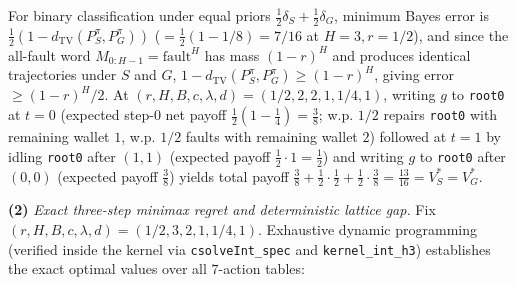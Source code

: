 \documentclass[11pt,a4paper]{article}
\begin{document}
For binary classification under equal priors
\(\frac{1}{2}\delta_S + \frac{1}{2}\delta_G\), minimum Bayes error is
\(\frac{1}{2}(1 - d_{\mathrm{TV}}(P_S^\pi, P_G^\pi))\)
(\(= \frac{1}{2}(1 - 1/8) = 7/16\) at \(H=3, r=1/2\)), and since the
all-fault word \(M_{0:H-1} = \mathrm{fault}^H\) has mass \((1-r)^H\) and
produces identical trajectories under \(S\) and \(G\),
\(1 - d_{\mathrm{TV}}(P_S^\pi, P_G^\pi) \ge (1-r)^H\), giving error
\(\ge (1-r)^H/2\). At \((r,H,B,c,\lambda,d) = (1/2, 2, 2, 1, 1/4, 1)\),
writing \(g\) to \texttt{root0} at \(t=0\) (expected step-0 net payoff
\(\frac{1}{2}(1 - \frac{1}{4}) = \frac{3}{8}\); w.p. \(1/2\) repairs
\texttt{root0} with remaining wallet \(1\), w.p. \(1/2\) faults with
remaining wallet \(2\)) followed at \(t=1\) by idling \texttt{root0}
after \((1,1)\) (expected payoff \(\frac{1}{2}\cdot 1 = \frac{1}{2}\))
and writing \(g\) to \texttt{root0} after \((0,0)\) (expected payoff
\(\frac{3}{8}\)) yields total payoff
\(\frac{3}{8} + \frac{1}{2}\cdot\frac{1}{2} + \frac{1}{2}\cdot\frac{3}{8} = \frac{13}{16} = V_S^* = V_G^*\).

\textbf{(2)} \emph{Exact three-step minimax regret and deterministic
lattice gap.} Fix \((r, H, B, c, \lambda, d) = (1/2, 3, 2, 1, 1/4, 1)\).
Exhaustive dynamic programming (verified inside the kernel via
\texttt{csolveInt\_spec} and \texttt{kernel\_int\_h3}) establishes the
exact optimal values over all \(7\)-action tables:
\end{document}
